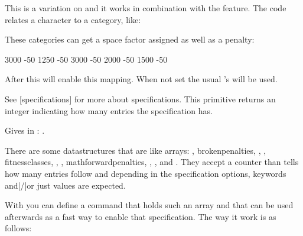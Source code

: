 \stopoldprimitive

\startoldprimitive[title={\prm {spcode}}]

This is a variation on  and it works in combination with the 
feature. The code relates a character to a category, like:

\starttyping
\spcode{}
\spcode{}
\spcode{}
\spcode{}
\spcode{}
\spcode{}
\stoptyping

These categories can get a space factor assigned as well as a penalty:

\starttyping
\specificationdef \nonpenalizedspacingmap {}
    3000 -50 %
    1250 -50 %
    3000 -50 %
    2000 -50 %
    1500 -50 %
\relax
\stoptyping

After this \typ {\textspacing \nonpenalizedspacingmap} will enable this mapping.
When not set the usual 's will be used.

\stopoldprimitive

\startnewprimitive[title={\prm {specificationcount}}]

See  [specifications] for more about specifications. This primitive returns
an integer indicating how many entries the specification has.

\startbuffer
\the\specificationcount\widowpenalties
\stopbuffer

\typebuffer

Gives in \CONTEXT: \inlinebuffer.

\stopnewprimitive

\startnewprimitive[title={\prm {specificationdef}}]

There are some datastructures that are like arrays: , \prm
{brokenpenalties}, , , \prm
{fitnessclasses}, , , \prm
{mathforwardpenalties}, , , 
and . They accept a counter than tells how many entries
follow and depending in the specification options, keywords and|/|or just values
are expected.

With  you can define a command that holds such an array
and that can be used afterwards as a fast way to enable that specification. The
way it work is as follows:

